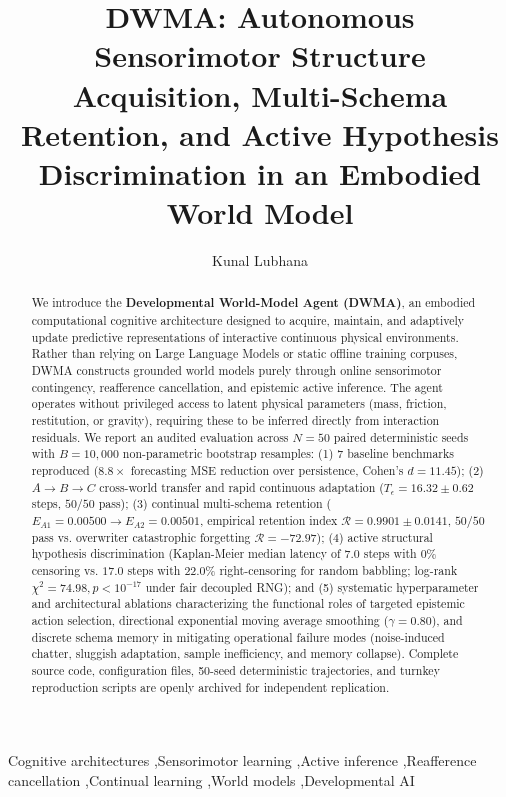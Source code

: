 \documentclass[preprint,12pt]{elsarticle}
\begin{document}
\begin{frontmatter}

\title{DWMA: Autonomous Sensorimotor Structure Acquisition, Multi-Schema Retention, and Active Hypothesis Discrimination in an Embodied World Model}

\author{Kunal Lubhana}

\begin{abstract}
We introduce the \textbf{Developmental World-Model Agent (DWMA)}, an embodied computational cognitive architecture designed to acquire, maintain, and adaptively update predictive representations of interactive continuous physical environments. Rather than relying on Large Language Models or static offline training corpuses, DWMA constructs grounded world models purely through online sensorimotor contingency, reafference cancellation, and epistemic active inference. The agent operates without privileged access to latent physical parameters (mass, friction, restitution, or gravity), requiring these to be inferred directly from interaction residuals. We report an audited evaluation across $N = 50$ paired deterministic seeds with $B = 10,000$ non-parametric bootstrap resamples: (1) 7 baseline benchmarks reproduced ($8.8\times$ forecasting MSE reduction over persistence, Cohen's $d = 11.45$); (2) $A \to B \to C$ cross-world transfer and rapid continuous adaptation ($T_\epsilon = 16.32 \pm 0.62$ steps, $50/50$ pass); (3) continual multi-schema retention ($E_{A1} = 0.00500 \to E_{A2} = 0.00501$, empirical retention index $\mathcal{R} = 0.9901 \pm 0.0141$, $50/50$ pass vs. overwriter catastrophic forgetting $\mathcal{R} = -72.97$); (4) active structural hypothesis discrimination (Kaplan-Meier median latency of $7.0$ steps with $0\%$ censoring vs. $17.0$ steps with $22.0\%$ right-censoring for random babbling; log-rank $\chi^2 = 74.98, p < 10^{-17}$ under fair decoupled RNG); and (5) systematic hyperparameter and architectural ablations characterizing the functional roles of targeted epistemic action selection, directional exponential moving average smoothing ($\gamma = 0.80$), and discrete schema memory in mitigating operational failure modes (noise-induced chatter, sluggish adaptation, sample inefficiency, and memory collapse). Complete source code, configuration files, 50-seed deterministic trajectories, and turnkey reproduction scripts are openly archived for independent replication.
\end{abstract}

\begin{keyword}
Cognitive architectures \sep Sensorimotor learning \sep Active inference \sep Reafference cancellation \sep Continual learning \sep World models \sep Developmental AI
\end{keyword}

\end{frontmatter}
\end{document}
